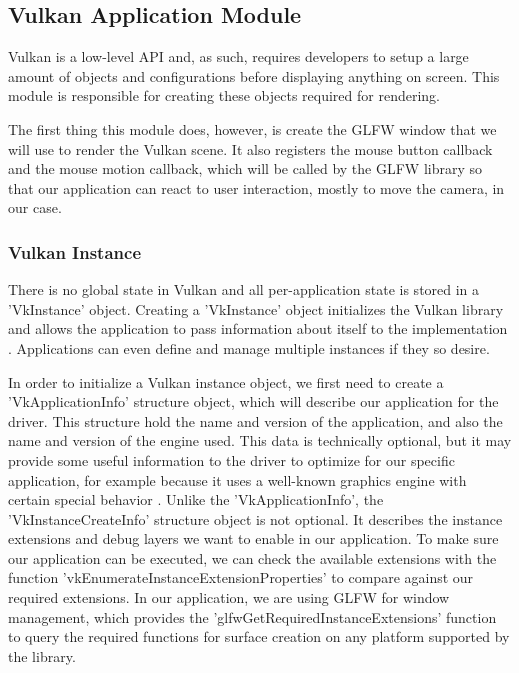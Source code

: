 \subsection{Vulkan Application Module}
Vulkan is a low-level API and, as such, requires developers to setup a large amount of objects and configurations before displaying anything on screen. This module is responsible for creating these objects required for rendering.

The first thing this module does, however, is create the GLFW window that we will use to render the Vulkan scene. It also registers the mouse button callback and the mouse motion callback, which will be called by the GLFW library so that our application can react to user interaction, mostly to move the camera, in our case.

\subsubsection{Vulkan Instance}
There is no global state in Vulkan and all per-application state is stored in a 'VkInstance' object. Creating a 'VkInstance' object initializes the Vulkan library and allows the application to pass information about itself to the implementation \cite{vulkan_docs}. Applications can even define and manage multiple instances if they so desire.

In order to initialize a Vulkan instance object, we first need to create a 'VkApplicationInfo' structure object, which will describe our application for the driver. This structure hold the name and version of the application, and also the name and version of the engine used. This data is technically optional, but it may provide some useful information to the driver to optimize for our specific application, for example because it uses a well-known graphics engine with certain special behavior \cite{vulkan_tutorial}. Unlike the 'VkApplicationInfo', the 'VkInstanceCreateInfo' structure object is not optional. It describes the instance extensions and debug layers we want to enable in our application. To make sure our application can be executed, we can check the available extensions with the function 'vkEnumerateInstanceExtensionProperties' to compare against our required extensions. In our application, we are using GLFW for window management, which provides the 'glfwGetRequiredInstanceExtensions' function \cite{glfw_vulkan} to query the required functions for surface creation on any platform supported by the library.

